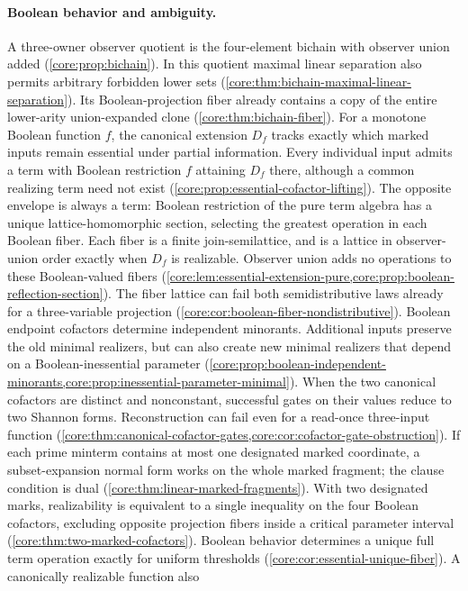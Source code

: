 \paragraph{Boolean behavior and ambiguity.}
A three-owner observer quotient is the four-element bichain with observer
union added (\cref{core:prop:bichain}). In this quotient maximal linear
separation also permits arbitrary forbidden lower sets
(\cref{core:thm:bichain-maximal-linear-separation}). Its Boolean-projection fiber
already contains a copy of the entire lower-arity union-expanded clone
(\cref{core:thm:bichain-fiber}). For a monotone Boolean function $f$,
the canonical extension $D_f$ tracks exactly which marked inputs remain
essential under partial information. Every individual input admits a
term with Boolean restriction $f$ attaining $D_f$ there, although a
common realizing term need not exist
(\cref{core:prop:essential-cofactor-lifting}). The opposite envelope is
always a term: Boolean restriction of the pure term algebra has a unique
lattice-homomorphic section, selecting the greatest operation in each
Boolean fiber. Each fiber is a finite join-semilattice, and is a lattice
in observer-union order exactly when $D_f$ is realizable.
Observer union adds no operations to these Boolean-valued fibers
(\cref{core:lem:essential-extension-pure,core:prop:boolean-reflection-section}).
The fiber lattice can fail both semidistributive laws already for a three-variable
projection (\cref{core:cor:boolean-fiber-nondistributive}).
Boolean endpoint cofactors determine independent minorants. Additional
inputs preserve the old minimal realizers, but can also create new minimal
realizers that depend on a Boolean-inessential parameter
(\cref{core:prop:boolean-independent-minorants,core:prop:inessential-parameter-minimal}).
When the two canonical cofactors are distinct and nonconstant, successful
gates on their values reduce to two Shannon forms. Reconstruction can fail
even for a read-once three-input function
(\cref{core:thm:canonical-cofactor-gates,core:cor:cofactor-gate-obstruction}).
If each prime minterm contains
at most one designated marked coordinate, a subset-expansion normal form
works on the whole marked fragment; the clause condition is dual
(\cref{core:thm:linear-marked-fragments}). With two designated marks,
realizability is equivalent to a single inequality on the four Boolean
cofactors, excluding opposite projection fibers inside a critical
parameter interval (\cref{core:thm:two-marked-cofactors}). Boolean behavior determines
a unique full term operation exactly for uniform thresholds
(\cref{core:cor:essential-unique-fiber}). A canonically realizable function also
